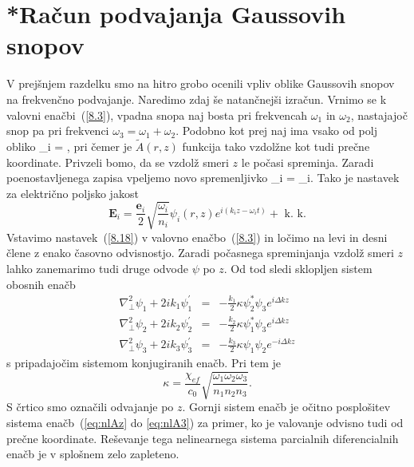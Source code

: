\section{{*}Račun podvajanja Gaussovih snopov}
V prejšnjem razdelku smo na hitro grobo ocenili vpliv oblike Gaussovih snopov
na frekvenčno podvajanje. Naredimo zdaj še natančnejši izračun. Vrnimo se k valovni
enačbi~(\ref{8.3}), vpadna snopa naj bosta pri frekvencah
$\omega_{1}$ in $\omega_{2}$, nastajajoč snop pa pri frekvenci
$\omega_{3}=\omega_{1}+\omega_{2}$.
Podobno kot prej naj ima vsako od polj obliko 
\beq
{}_{i}  = ,
\eeq
pri čemer je $\tilde{A}(r,z)$ funkcija tako vzdolžne kot tudi prečne koordinate. Privzeli
bomo, da se vzdolž smeri  $z$ le počasi spreminja.
Zaradi poenostavljenega zapisa vpeljemo novo spremenljivko 
\beq
\psi_i = _i.
\eeq
Tako je nastavek za električno poljsko jakost
\begin{equation}
\mathbf{E}_{i}=\frac{\mathbf{e}_{i}}{2}\sqrt{\frac{\omega_{i}}{n_{i}}}\psi_{i}(r,z)
e^{i(k_{i}z-\omega_{i}t)}+\mbox{ k. k.}
\label{8.18}
\end{equation}
Vstavimo nastavek~(\ref{8.18}) v valovno
enačbo~(\ref{8.3}) in ločimo na levi in desni člene z enako časovno odvisnostjo.
Zaradi počasnega spreminjanja vzdolž smeri $z$ lahko zanemarimo tudi druge odvode 
$\psi$ po $z$. Od tod sledi sklopljen sistem obosnih enačb 
\begin{eqnarray}
\nabla_{\perp}^{2}\psi_{1}+2ik_{1}\psi_{1}^{\prime} & = & -
\frac{k_{1}}{2}\kappa\psi_{2}^{\ast}\psi_{3}e^{i\Delta kz}\\
\nabla_{\perp}^{2}\psi_{2}+2ik_{2}\psi_{2}^{\prime} & = & -
\frac{k_{2}}{2}\kappa\psi_{1}^{\ast}\psi_{3}e^{i\Delta kz}\\
\nabla_{\perp}^{2}\psi_{3}+2ik_{3}\psi_{3}^{\prime} & =
& - \frac{k_{3}}{2}\kappa\psi_{1}\psi_{2}e^{-i\Delta kz}
\label{SHGGauss_3}
\end{eqnarray}
s pripadajočim sistemom konjugiranih enačb. Pri tem je 
\begin{equation}
\kappa=\frac{\chi_{ef}}{c_0} \sqrt{\frac{\omega_{1}\omega_{2}\omega_{3}}{n_{1}n_{2}n_{3}}}.
\label{8.20}
\end{equation}
S črtico smo označili odvajanje po $z$. Gornji sistem enačb je očitno
posplošitev sistema enačb~(\ref{eq:nlAz} do \ref{eq:nlA3}) za primer, ko je valovanje odvisno
tudi od prečne koordinate. Reševanje tega nelinearnega sistema parcialnih
diferencialnih enačb je v splošnem zelo zapleteno.

